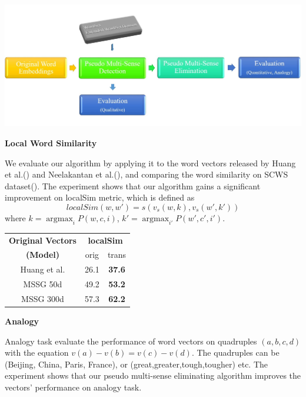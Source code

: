 \documentclass[landscape,final,b0paper,fontscale=0.285]{baposter}
\DeclareMathOperator*{\argmax}{argmax}
\begin{document}
\begin{poster}
{    \begin{multicols}{2}
	\begin{center}
      \includegraphics[width=\linewidth]{flow}
	  \\ \vspace{-0.8em}
	  \end{center}
\noindent \textbf{\large Local Word Similarity}
\par
We evaluate our algorithm by applying it to the word vectors released by Huang et al.(\cite{huang}) and Neelakantan et al.(\cite{neelakantan}), and comparing the word similarity on SCWS dataset(\cite{huang}). The experiment shows that our algorithm gains a significant improvement on localSim metric, which is defined as 
\begin{equation}
localSim(w,w') = s(v_s(w,k), v_s(w',k'))\nonumber
\end{equation}
where $k = \mathop{\argmax}_i P(w,c,i)$, $k' = \mathop{\argmax}_{i'} P(w',c',i')$.
\begin{center}
 \begin{tabular}{|c|cc|}
 \hline
 \multirow{1}{*}{\textbf{Original Vectors}} &\multicolumn{2}{c|}{\textbf{localSim}} \\
\textbf{(Model)} & orig & trans \\
 \hline 
 Huang et al.  & 26.1 & \textbf{37.6} \\
 MSSG 50d & 49.2 &\textbf{53.2} \\
 MSSG 300d & 57.3 &\textbf{62.2}\\
 \hline
 \end{tabular}
\end{center}
\noindent \textbf{\large Analogy}
\par
Analogy task evaluate the performance of word vectors on quadruples $(a,b,c,d)$ with the equation $v(a)-v(b) = v(c)-v(d)$. The quadruples can be (Beijing, China, Paris, France), or (great,greater,tough,tougher) etc. The experiment shows that our pseudo multi-sense eliminating algorithm improves the vectors' performance on analogy task.

\end{multicols}}
\end{poster}
\end{document}
